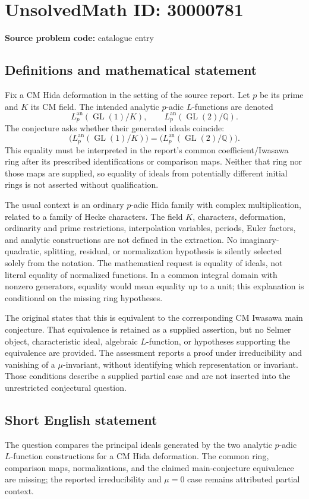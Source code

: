\documentclass[11pt]{article}
\newcommand{\Q}{\mathbb{Q}}
\begin{document}
\section*{UnsolvedMath ID: 30000781}
\textbf{Source problem code:} catalogue entry
\subsection{Definitions and mathematical statement}
Fix a CM Hida deformation in the setting of the source report. Let $p$ be its prime and $K$ its CM field. The intended analytic $p$-adic $L$-functions are denoted
\[
 L_p^{\mathrm{an}}(\operatorname{GL}(1)/K),
 \qquad
 L_p^{\mathrm{an}}(\operatorname{GL}(2)/\Q).
\]
The conjecture asks whether their generated ideals coincide:
\[
 \bigl(L_p^{\mathrm{an}}(\operatorname{GL}(1)/K)\bigr)
   =\bigl(L_p^{\mathrm{an}}(\operatorname{GL}(2)/\Q)\bigr).
\]
This equality must be interpreted in the report's common coefficient/Iwasawa ring after its prescribed identifications or comparison maps. Neither that ring nor those maps are supplied, so equality of ideals from potentially different initial rings is not asserted without qualification.

The usual context is an ordinary $p$-adic Hida family with complex multiplication, related to a family of Hecke characters. The field $K$, characters, deformation, ordinarity and prime restrictions, interpolation variables, periods, Euler factors, and analytic constructions are not defined in the extraction. No imaginary-quadratic, splitting, residual, or normalization hypothesis is silently selected solely from the notation. The mathematical request is equality of ideals, not literal equality of normalized functions. In a common integral domain with nonzero generators, equality would mean equality up to a unit; this explanation is conditional on the missing ring hypotheses.

The original states that this is equivalent to the corresponding CM Iwasawa main conjecture. That equivalence is retained as a supplied assertion, but no Selmer object, characteristic ideal, algebraic $L$-function, or hypotheses supporting the equivalence are provided. The assessment reports a proof under irreducibility and vanishing of a $\mu$-invariant, without identifying which representation or invariant. Those conditions describe a supplied partial case and are not inserted into the unrestricted conjectural question.
\subsection{Short English statement}
The question compares the principal ideals generated by the two analytic $p$-adic $L$-function constructions for a CM Hida deformation. The common ring, comparison maps, normalizations, and the claimed main-conjecture equivalence are missing; the reported irreducibility and $\mu=0$ case remains attributed partial context.
\end{document}
